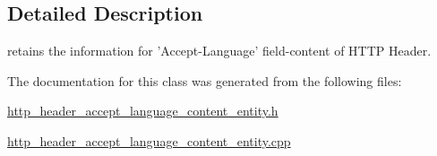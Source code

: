 \subsection{Detailed Description}
retains the information for 'Accept-\/\-Language' field-\/content of H\-T\-T\-P Header. 

The documentation for this class was generated from the following files\-:\begin{DoxyCompactItemize}
\item 
\hyperlink{http__header__accept__language__content__entity_8h}{http\-\_\-header\-\_\-accept\-\_\-language\-\_\-content\-\_\-entity.\-h}\item 
\hyperlink{http__header__accept__language__content__entity_8cpp}{http\-\_\-header\-\_\-accept\-\_\-language\-\_\-content\-\_\-entity.\-cpp}\end{DoxyCompactItemize}
